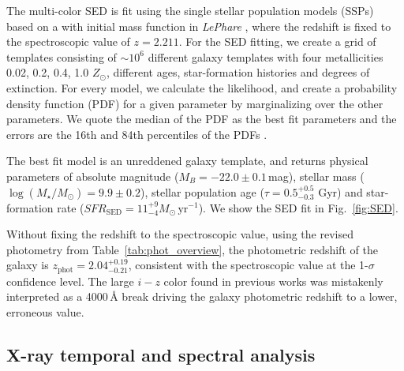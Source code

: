 \documentclass{aa}    %
\begin{document}


The multi-color SED is fit using the \citet{Bruzual2003} single stellar
population models (SSPs) based on a \citet{Chabrier2003} with initial mass function in
\emph{LePhare} \citep{Ilbert2006}, where the redshift is fixed to the
spectroscopic value of $z=2.211$. For the SED fitting, we create a grid of
templates consisting of $\sim 10^6$  different galaxy templates with four
metallicities 0.02, 0.2, 0.4, 1.0 $Z_{\odot}$, different ages, star-formation
histories and degrees of extinction. For every model, we calculate the
likelihood, and create a probability density function (PDF) for a given
parameter by marginalizing over the other parameters. We quote the median of the
PDF as the best fit parameters and the errors are the 16th and 84th percentiles
of the PDFs \citep[e.g. see][for details on the SED fitting
procedure]{Schulze2016}.

The best fit model is an unreddened galaxy
template, and returns physical parameters of absolute magnitude
($M_B=-22.0\pm0.1$\,mag), stellar mass ($\log(M_{\star}/M_\odot) = 9.9\pm0.2$),
stellar population age ($\tau = 0.5_{-0.3}^{+0.5}$ Gyr) and star-formation rate
($SFR_{\mathrm{SED}}=11_{-4}^{+9} M_\odot\,\mathrm{yr}^{-1}$). We show the SED
fit in Fig.~\ref{fig:SED}.

Without fixing the redshift to the spectroscopic value, using the revised
photometry from Table~\ref{tab:phot_overview}, the photometric redshift of the
galaxy is $z_{\mathrm{phot}}=2.04_{-0.21}^{+0.19}$, consistent with the
spectroscopic value at the 1-$\sigma$ confidence level. The large $i-z$ color
found in previous works was mistakenly interpreted as a 4000\,\AA{} break
driving the galaxy photometric redshift to a lower, erroneous value.

\subsection{X-ray temporal and spectral analysis}\label{xray}
\end{document}
